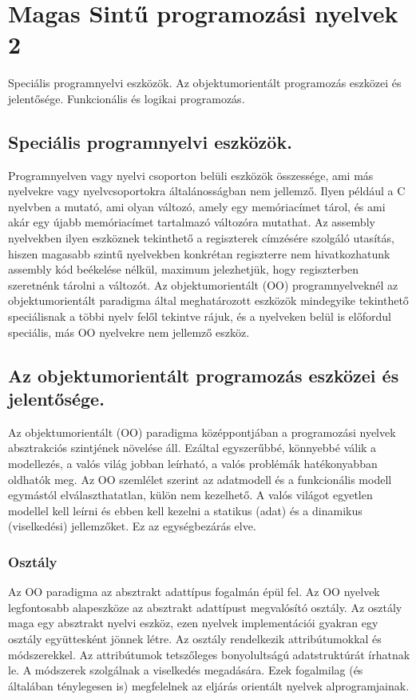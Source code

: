 \section{Magas Sintű programozási nyelvek 2}
{\footnotesize Speciális programnyelvi eszközök. Az objektumorientált programozás eszközei és jelentősége. Funkcionális és logikai programozás.}
\subsection{Speciális programnyelvi eszközök.}
Programnyelven vagy nyelvi csoporton belüli eszközök összessége, ami más nyelvekre vagy nyelvcsoportokra általánosságban nem jellemző. Ilyen például a C nyelvben a mutató, ami olyan változó, amely egy memóriacímet tárol, és ami akár egy újabb memóriacímet tartalmazó változóra mutathat. Az assembly nyelvekben ilyen eszköznek tekinthető a regiszterek címzésére szolgáló utasítás, hiszen magasabb szintű nyelvekben konkrétan regiszterre nem hivatkozhatunk assembly kód beékelése nélkül, maximum jelezhetjük, hogy regiszterben szeretnénk tárolni a változót. Az objektumorientált (OO) programnyelveknél az objektumorientált paradigma által meghatározott eszközök mindegyike tekinthető speciálisnak a többi nyelv felől tekintve rájuk, és a nyelveken belül is előfordul speciális, más OO nyelvekre nem jellemző eszköz.

\subsection{Az objektumorientált programozás eszközei és jelentősége.}
Az objektumorientált (OO) paradigma középpontjában a programozási nyelvek absztrakciós szintjének növelése áll. Ezáltal egyszerűbbé, könnyebbé válik a modellezés, a valós világ jobban leírható, a valós problémák hatékonyabban oldhatók meg. Az OO szemlélet szerint az adatmodell és a funkcionális modell egymástól elválaszthatatlan, külön nem kezelhető. A valós világot egyetlen modellel kell leírni és ebben kell kezelni a statikus (adat) és a dinamikus (viselkedési) jellemzőket. Ez az egységbezárás elve.

\subsubsection{Osztály}
Az OO paradigma az absztrakt adattípus fogalmán épül fel. Az OO nyelvek legfontosabb alapeszköze az absztrakt adattípust megvalósító osztály. Az osztály maga egy absztrakt nyelvi eszköz, ezen nyelvek implementációi gyakran egy osztály együttesként jönnek létre. Az osztály rendelkezik attribútumokkal és módszerekkel. Az attribútumok tetszőleges bonyolultságú adatstruktúrát írhatnak le. A módszerek szolgálnak a viselkedés megadására. Ezek fogalmilag (és általában ténylegesen is) megfelelnek az eljárás orientált nyelvek alprogramjainak.

